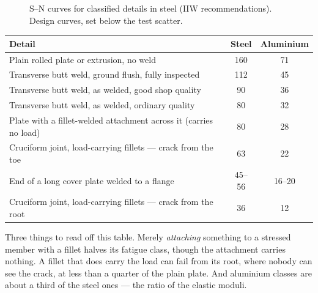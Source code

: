 \documentclass[11pt,a4paper]{article}
\begin{document}
\begin{figure}[H]\centering
\resizebox{0.86\textwidth}{!}{}
\caption{S--N curves for classified details in steel (IIW recommendations). Design curves, set
below the test scatter.}
\label{fig:fat}
\end{figure}

\begin{center}\footnotesize
\begin{tabular}{@{}p{9.2cm}cc@{}}
\toprule
\textbf{Detail} & \textbf{Steel} & \textbf{Aluminium}\\
\midrule
Plain rolled plate or extrusion, no weld & 160 & 71\\
Transverse butt weld, ground flush, fully inspected & 112 & 45\\
Transverse butt weld, as welded, good shop quality & 90 & 36\\
Transverse butt weld, as welded, ordinary quality & 80 & 32\\
Plate with a fillet-welded attachment across it (carries no load) & 80 & 28\\
Cruciform joint, load-carrying fillets --- crack from the toe & 63 & 22\\
End of a long cover plate welded to a flange & 45--56 & 16--20\\
Cruciform joint, load-carrying fillets --- crack from the root & 36 & 12\\
\bottomrule
\end{tabular}
\end{center}

\noindent Three things to read off this table. Merely \emph{attaching} something to a stressed
member with a fillet halves its fatigue class, though the attachment carries nothing. A fillet that
does carry the load can fail from its root, where nobody can see the crack, at less than a quarter
of the plain plate. And aluminium classes are about a third of the steel ones --- the ratio of the
elastic moduli.
\end{document}

